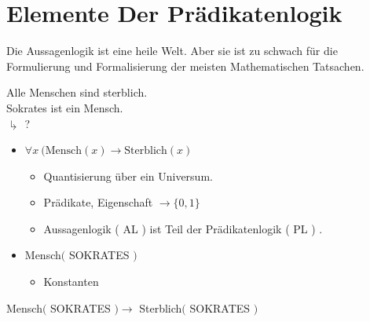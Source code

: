 \section{Elemente Der Prädikatenlogik}
Die Aussagenlogik ist eine heile Welt. Aber sie ist zu schwach für die Formulierung und Formalisierung der meisten Mathematischen Tatsachen.\\
\begin{bsp}
	Alle Menschen sind sterblich. \\
	Sokrates ist ein Mensch. \\
	$\drsh$ ? \\
	\begin{itemize}
		\item $\forall x ~ ( \text{Mensch}( x ) \rightarrow \text{Sterblich}( x )$
		\begin{itemize}
			\item Quantisierung über ein Universum.
			\item Prädikate, Eigenschaft $\rightarrow \{ 0 , 1 \}$
			\item Aussagenlogik ( AL ) ist Teil der Prädikatenlogik ( PL ) .
		\end{itemize}
		\item Mensch$($ SOKRATES $)$
			\begin{itemize}
				\item Konstanten
			\end{itemize}
	\end{itemize}
	Mensch$($ SOKRATES $) \rightarrow$ Sterblich$($ SOKRATES $)$
\end{bsp}
